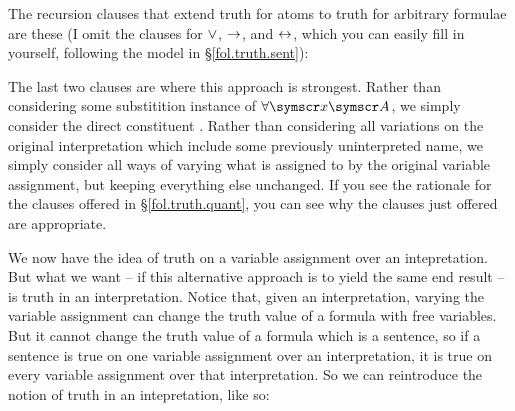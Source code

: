 \begin{earg}
The recursion clauses that extend truth for atoms to truth for arbitrary formulae are these (I omit the clauses for $\vee$, $\rightarrow$, and $\leftrightarrow$, which you can easily fill in yourself, following the model in §\ref{fol.truth.sent}): 

The last two clauses are where this approach is strongest. Rather than considering some substitition instance of $\forall\meta{x}\meta{A}$, we simply consider the direct constituent . Rather than considering all variations on the original interpretation which include some previously uninterpreted name, we simply consider all ways of varying what is assigned to  by the original variable assignment, but keeping everything else unchanged. If you see the rationale for the clauses offered in §\ref{fol.truth.quant}, you can see why the clauses just offered are appropriate.

We now have the idea of truth on a variable assignment over an intepretation. But what we want – if this alternative approach is to yield the same end result – is truth in an interpretation. Notice that, given an interpretation, varying the variable assignment can change the truth value of a formula with free variables. But it cannot change the truth value of a formula which is a sentence, so if a sentence is true on one variable assignment over an interpretation, it is true on every variable assignment over that interpretation. So we can reintroduce the notion of truth in an intepretation, like so:  


\end{earg}

